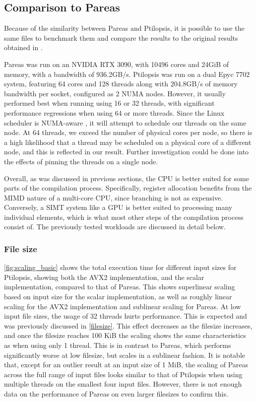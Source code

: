 \documentclass[11pt,dvipsnames]{article}
\begin{document}
\subsection{Comparison to Pareas} \label{discussion}

Because of the similarity between Pareas and Ptilopsis, it is possible to use the same files to benchmark them and compare the results to the original results obtained in \cite{huijben2021}.

Pareas was run on an NVIDIA RTX 3090, with 10496 cores and 24GiB of memory, with a bandwidth of 936.2GB/s. Ptilopsis was run on a dual Epyc 7702 system, featuring 64 cores and 128 threads along with 204.8GB/s of memory bandwidth per socket, configured as 2 NUMA nodes. However, it usually performed best when running using 16 or 32 threads, with significant performance regressions when using 64 or more threads. Since the Linux scheduler is NUMA-aware \cite{kernelnuma}, it will attempt to schedule our threads on the same node. At 64 threads, we exceed the number of physical cores per node, so there is a high likelihood that a thread may be scheduled on a physical core of a different node, and this is reflected in our result. Further investigation could be done into the effects of pinning the threads on a single node.

Overall, as was discussed in previous sections, the CPU is better suited for some parts of the compilation process. Specifically, register allocation benefits from the MIMD nature of a multi-core CPU, since branching is not as expensive. Conversely, a SIMT system like a GPU is better suited to processing many individual elements, which is what most other steps of the compilation process consist of. The previously tested workloads are discussed in detail below.

\subsubsection*{File size}

\autoref{fig:scaling_basic} shows the total execution time for different input sizes for Ptilopsis, showing both the AVX2 implementation, and the scalar implementation, compared to that of Pareas. This shows superlinear scaling based on input size for the scalar implementation, as well as roughly linear scaling for the AVX2 implementation and sublinear scaling for Pareas. At low input file sizes, the usage of 32 threads hurts performance. This is expected and was previously discussed in \autoref{filesize}. This effect decreases as the filesize increases, and once the filesize reaches 100 KiB the scaling shows the same characteristics as when using only 1 thread. This is in contrast to Pareas, which performs significantly worse at low filesize, but scales in a sublinear fashion. It is notable that, except for an outlier result at an input size of 1 MiB, the scaling of Pareas across the full range of input files looks similar to that of Ptilopsis when using multiple threads on the smallest four input files. However, there is not enough data on the performance of Pareas on even larger filesizes to confirm this.
\end{document}
